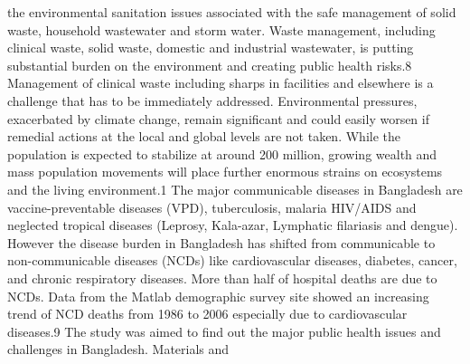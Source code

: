 \documentclass[a4paper,12pt]{article}
\begin{document}
the environmental sanitation issues associated with the
safe management of solid waste, household wastewater
and storm water. Waste management, including clinical
waste, solid waste, domestic and industrial wastewater,
is putting substantial burden on the environment and
creating public health risks.8 Management of clinical
waste including sharps in facilities and elsewhere is a
challenge that has to be immediately addressed.
Environmental pressures, exacerbated by climate
change, remain significant and could easily worsen if
remedial actions at the local and global levels are not
taken. While the population is expected to stabilize at
around 200 million, growing wealth and mass
population movements will place further enormous
strains on ecosystems and the living environment.1
The major communicable diseases in Bangladesh are
vaccine-preventable diseases (VPD), tuberculosis,
malaria HIV/AIDS and neglected tropical diseases
(Leprosy, Kala-azar, Lymphatic filariasis and dengue).
However the disease burden in Bangladesh has shifted
from communicable to non-communicable diseases
(NCDs) like cardiovascular diseases, diabetes, cancer,
and chronic respiratory diseases. More than half of
hospital deaths are due to NCDs. Data from the Matlab
demographic survey site showed an increasing trend of
NCD deaths from 1986 to 2006 especially due to
cardiovascular diseases.9 The study was aimed to find
out the major public health issues and challenges in
Bangladesh.
Materials and







\newpage


\printbibliography[heading=bibintoc, title={References}]
\end{document}
